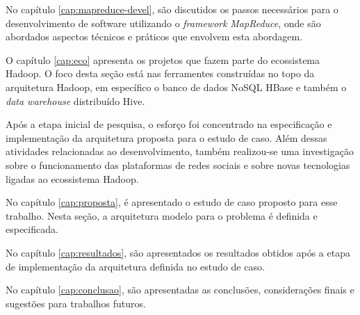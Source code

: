 No capítulo \ref{cap:mapreduce-devel}, são discutidos os passos necessários para o desenvolvimento de software utilizando o \textit{framework} \textit{MapReduce}, onde são abordados aspectos técnicos e práticos que envolvem esta abordagem.

O capítulo \ref{cap:eco} apresenta os projetos que fazem parte do ecossistema Hadoop. O foco desta seção está nas ferramentes construídas no topo da arquitetura Hadoop, em específico o banco de dados NoSQL HBase e também o \textit{data warehouse} distribuído Hive.

Após a etapa inicial de pesquisa, o esforço foi concentrado na especificação e implementação da arquitetura proposta para o estudo de caso. Além dessas atividades relacionadas ao desenvolvimento, também realizou-se uma investigação sobre o funcionamento das plataformas de redes sociais e sobre novas tecnologias ligadas ao ecossistema Hadoop.

No capítulo \ref{cap:proposta}, é apresentado o estudo de caso proposto para esse trabalho. Nesta seção, a arquitetura modelo para o problema é definida e especificada.

No capítulo \ref{cap:resultados}, são apresentados os resultados obtidos após a etapa de implementação da arquitetura definida no estudo de caso.

No capítulo \ref{cap:conclusao}, são apresentadas as conclusões, considerações finais e sugestões para trabalhos futuros.
